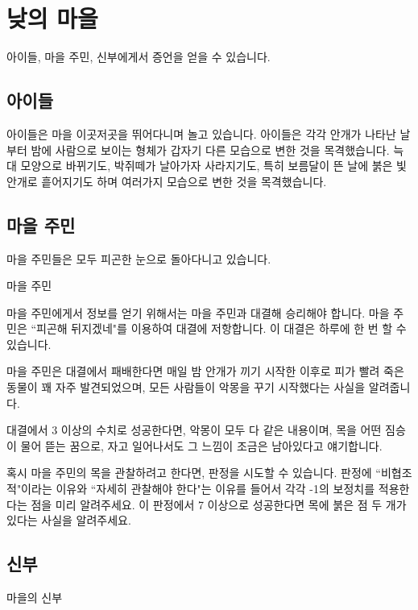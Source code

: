 \documentclass{report}
\begin{document}
	\section{낮의 마을}
	아이들, 마을 주민, 신부에게서 증언을 얻을 수 있습니다.
	
	\subsection{아이들}
	아이들은 마을 이곳저곳을 뛰어다니며 놀고 있습니다. 아이들은 각각 안개가 나타난 날 부터 밤에 사람으로 보이는 형체가 갑자기 다른 모습으로 변한 것을 목격했습니다. 늑대 모양으로 바뀌기도, 박쥐떼가 날아가자 사라지기도, 특히 보름달이 뜬 날에 붉은 빛 안개로 흩어지기도 하며 여러가지 모습으로 변한 것을 목격했습니다.
	
	\subsection{마을 주민}
	마을 주민들은 모두 피곤한 눈으로 돌아다니고 있습니다.
	
	\begin{lite}{마을 주민}
		\subject{수면 부족}
		
	\end{lite}
	
	마을 주민에게서 정보를 얻기 위해서는 마을 주민과 대결해 승리해야 합니다. 마을 주민은 ``피곤해 뒤지겠네"를 이용하여 대결에 저항합니다. 이 대결은 하루에 한 번 할 수 있습니다.
	
	마을 주민은 대결에서 패배한다면 매일 밤 안개가 끼기 시작한 이후로 피가 빨려 죽은 동물이 꽤 자주 발견되었으며, 모든 사람들이 악몽을 꾸기 시작했다는 사실을 알려줍니다.
	
	대결에서 3 이상의 수치로 성공한다면, 악몽이 모두 다 같은 내용이며, 목을 어떤 짐승이 물어 뜯는 꿈으로, 자고 일어나서도 그 느낌이 조금은 남아있다고 얘기합니다.
	
	혹시 마을 주민의 목을 관찰하려고 한다면, 판정을 시도할 수 있습니다. 판정에 ``비협조적"이라는 이유와 ``자세히 관찰해야 한다"는 이유를 들어서 각각 -1의 보정치를 적용한다는 점을 미리 알려주세요. 이 판정에서 7 이상으로 성공한다면 목에 붉은 점 두 개가 있다는 사실을 알려주세요.
	
	\subsection{신부}
	\begin{lite}{마을의 신부}
		\subject{신성의 수호자}
		
		
	\end{lite}
	
\end{document}
